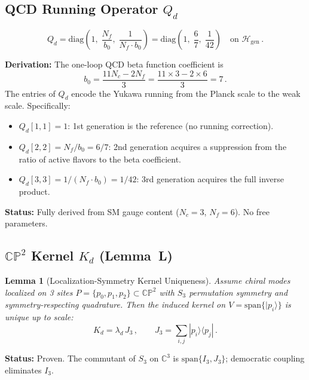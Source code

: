 \documentclass[11pt,a4paper]{article}
\newcommand{\CP}{\mathbb{CP}}
\newcommand{\C}{\mathbb{C}}
\newtheorem{lemma}[theorem]{Lemma}
\theoremstyle{definition}
\theoremstyle{remark}
\begin{document}
\subsection{QCD Running Operator $Q_d$}

\begin{equation}
\boxed{Q_d = \text{diag}\!\left(1,\; \frac{N_f}{b_0},\; \frac{1}{N_f \cdot b_0}\right)
     = \text{diag}\!\left(1,\; \frac{6}{7},\; \frac{1}{42}\right)}
\quad \text{on } \mathcal{H}_{\text{gen}}\,.
\end{equation}

\noindent
\textbf{Derivation:}  The one-loop QCD beta function coefficient is
\begin{equation}
b_0 = \frac{11 N_c - 2 N_f}{3} = \frac{11 \times 3 - 2 \times 6}{3} = 7\,.
\end{equation}
The entries of $Q_d$ encode the Yukawa running from the Planck scale to the
weak scale.  Specifically:
\begin{itemize}
\item $Q_d[1,1] = 1$: 1st generation is the reference (no running correction).
\item $Q_d[2,2] = N_f/b_0 = 6/7$: 2nd generation acquires a suppression
      from the ratio of active flavors to the beta coefficient.
\item $Q_d[3,3] = 1/(N_f \cdot b_0) = 1/42$: 3rd generation acquires the
      full inverse product.
\end{itemize}

\noindent
\textbf{Status:}  {\color{proven}Fully derived from SM gauge content
($N_c = 3$, $N_f = 6$).  No free parameters.}

\subsection{$\CP^2$ Kernel $K_d$ (Lemma~L)}

\begin{lemma}[Localization-Symmetry Kernel Uniqueness]
\label{lem:L}
Assume chiral modes localized on 3 sites $P = \{p_0, p_1, p_2\} \subset \CP^2$
with $S_3$ permutation symmetry and symmetry-respecting quadrature.  Then the
induced kernel on $V = \text{span}\{|p_i\rangle\}$ is unique up to scale:
\begin{equation}
K_d = \lambda_d\, J_3\,,\qquad J_3 = \sum_{i,j} |p_i\rangle\langle p_j|\,.
\end{equation}
\end{lemma}

\noindent
\textbf{Status:} {\color{proven}Proven.}  The commutant of $S_3$ on $\C^3$
is $\text{span}\{I_3, J_3\}$; democratic coupling eliminates $I_3$.
\end{document}
